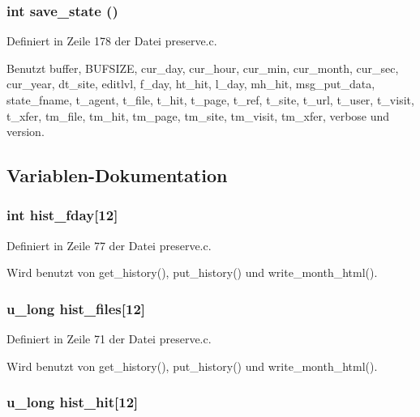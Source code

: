 \subsubsection{\setlength{\rightskip}{0pt plus 5cm}int save\_\-state ()}\label{preserve_8h_30d384683c4584a041792cf314051fa3}




Definiert in Zeile 178 der Datei preserve.c.

Benutzt buffer, BUFSIZE, cur\_\-day, cur\_\-hour, cur\_\-min, cur\_\-month, cur\_\-sec, cur\_\-year, dt\_\-site, editlvl, f\_\-day, ht\_\-hit, l\_\-day, mh\_\-hit, msg\_\-put\_\-data, state\_\-fname, t\_\-agent, t\_\-file, t\_\-hit, t\_\-page, t\_\-ref, t\_\-site, t\_\-url, t\_\-user, t\_\-visit, t\_\-xfer, tm\_\-file, tm\_\-hit, tm\_\-page, tm\_\-site, tm\_\-visit, tm\_\-xfer, verbose und version.

\subsection{Variablen-Dokumentation}
\subsubsection{\setlength{\rightskip}{0pt plus 5cm}int {\bf hist\_\-fday}[12]}\label{preserve_8h_aa2fe5b00c099187be9c1aace6552a9c}




Definiert in Zeile 77 der Datei preserve.c.

Wird benutzt von get\_\-history(), put\_\-history() und write\_\-month\_\-html().
\subsubsection{\setlength{\rightskip}{0pt plus 5cm}u\_\-long {\bf hist\_\-files}[12]}\label{preserve_8h_5fce0b39aa3228d6b471e9294f1fed9d}




Definiert in Zeile 71 der Datei preserve.c.

Wird benutzt von get\_\-history(), put\_\-history() und write\_\-month\_\-html().
\subsubsection{\setlength{\rightskip}{0pt plus 5cm}u\_\-long {\bf hist\_\-hit}[12]}\label{preserve_8h_71b324074ec02105c3730f77c0ab3e50}




